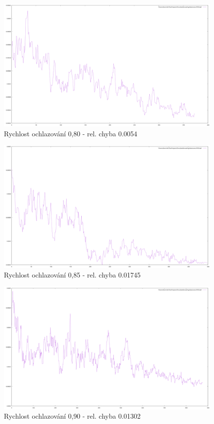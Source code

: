 \documentclass[12pt,a4paper]{article}
\begin{document}
\begin{figure}[H]
\includegraphics[width=\textwidth]{topCalcBottomCalc80}
\caption{Rychlost ochlazování 0,80 - rel. chyba 0.0054}
\label{topCalcBottomCalc80}
\end{figure}

\begin{figure}[H]
\includegraphics[width=\textwidth]{topCalcBottomCalc85}
\caption{Rychlost ochlazování 0,85 - rel. chyba 0.01745}
\label{topCalcBottomCalc85}
\end{figure}

\begin{figure}[H]
\includegraphics[width=\textwidth]{topCalcBottomCalc90}
\caption{Rychlost ochlazování 0,90 - rel. chyba 0.01302}
\label{topCalcBottomCalc90}
\end{figure}
\end{document}
